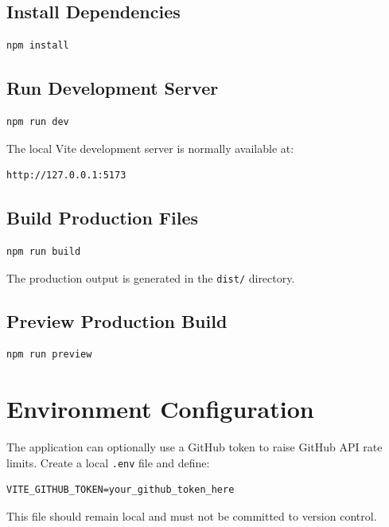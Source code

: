 \documentclass[12pt,a4paper]{article}
\newcommand{\code}[1]{\colorbox{CodeBg}{\texttt{#1}}}
\begin{document}
\subsection{Install Dependencies}

\begin{verbatim}
npm install
\end{verbatim}

\subsection{Run Development Server}

\begin{verbatim}
npm run dev
\end{verbatim}

The local Vite development server is normally available at:

\begin{verbatim}
http://127.0.0.1:5173
\end{verbatim}

\subsection{Build Production Files}

\begin{verbatim}
npm run build
\end{verbatim}

The production output is generated in the \code{dist/} directory.

\subsection{Preview Production Build}

\begin{verbatim}
npm run preview
\end{verbatim}

\section{Environment Configuration}

The application can optionally use a GitHub token to raise GitHub API rate
limits. Create a local \code{.env} file and define:

\begin{verbatim}
VITE_GITHUB_TOKEN=your_github_token_here
\end{verbatim}

This file should remain local and must not be committed to version control.
\end{document}
